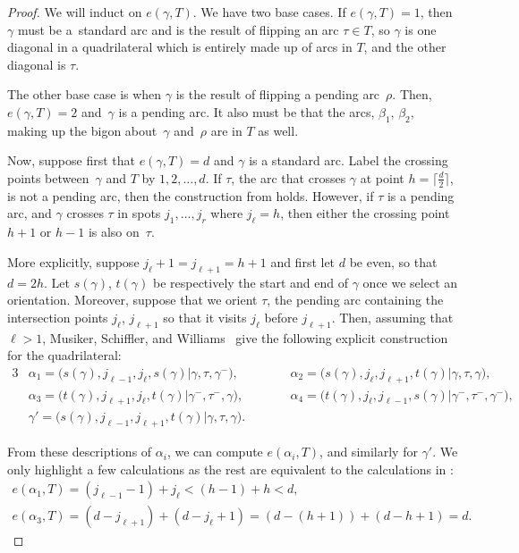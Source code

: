 \documentclass[pdftex]{sigma}%
\numberwithin{equation}{section}
\begin{document}
\begin{proof}We will induct on $e(\gamma, T)$. We have two base cases. If $e(\gamma, T) = 1$, then $\gamma$ must be a~standard arc and is the result of flipping an arc $\tau \in T$, so $\gamma$ is one diagonal in a quadrilateral which is entirely made up of arcs in $T$, and the other diagonal is $\tau$.

The other base case is when $\gamma$ is the result of flipping a pending arc~$\rho$. Then, $e(\gamma,T) = 2$ and~$\gamma$ is a pending arc. It also must be that the arcs, $\beta_1$, $\beta_2$, making up the bigon about~$\gamma$ and~$\rho$ are in $T$ as well.

 Now, suppose first that $e(\gamma, T) = d$ and $\gamma$ is a standard arc. Label the crossing points between~$\gamma$ and $T$ by $1,2, \ldots, d$. If $\tau$, the arc that crosses $\gamma$ at point $h = \lceil \frac{d}{2} \rceil$, is not a pending arc, then the construction from \cite[Lemma~9.1]{MSW} holds. However, if $\tau$ is a pending arc, and $\gamma$ crosses $\tau$ in spots $j_1,\ldots, j_r$ where $j_\ell = h$, then either the crossing point $h+1$ or $h-1$ is also on~$\tau$.

More explicitly, suppose $j_{\ell} + 1 = j_{\ell + 1} = h+1$ and first let $d$ be even, so that $d = 2h$. Let $s(\gamma)$, $t(\gamma)$ be respectively the start and end of $\gamma$ once we select an orientation. Moreover, suppose that we orient $\tau$, the pending arc containing the intersection points $j_\ell$, $j_{\ell + 1}$ so that it visits $j_\ell$ before $j_{\ell+1}$. Then, assuming that $\ell > 1$, Musiker, Schiffler, and Williams~\cite{MSW} give the following explicit construction for the quadrilateral:
\begin{alignat*}{3}
 & \alpha_1 = \big(s(\gamma), j_{\ell - 1}, j_\ell, s(\gamma) \vert \gamma, \tau, \gamma^-\big), \qquad &&
 \alpha_2 = \big(s(\gamma), j_\ell, j_{\ell + 1}, t(\gamma) \vert \gamma, \tau, \gamma\big), & \\
 & \alpha_3 = \big(t(\gamma), j_{\ell+1}, j_\ell, t(\gamma) \vert \gamma^-, \tau^-, \gamma\big), \qquad &&
 \alpha_4 = \big(t(\gamma), j_\ell, j_{\ell - 1}, s(\gamma) \vert \gamma^-, \tau^-, \gamma^-\big), & \\
 &\gamma' = \big(s(\gamma), j_{\ell - 1}, j_{\ell + 1}, t(\gamma) \vert \gamma, \tau, \gamma\big).\qquad &&&
\end{alignat*}

From these descriptions of $\alpha_i$, we can compute $e(\alpha_i,T)$, and similarly for $\gamma'$. We only highlight a few calculations as the rest are equivalent to the calculations in \cite{MSW}:
\begin{gather*}
 e(\alpha_1,T)= (j_{\ell-1} - 1) + j_\ell < (h-1) + h < d ,\\
 e(\alpha_3,T)= (d - j_{\ell + 1}) + (d - j_{\ell} + 1) = (d - (h+1)) + (d - h + 1) = d.
\end{gather*}


\end{proof}
\end{document}
